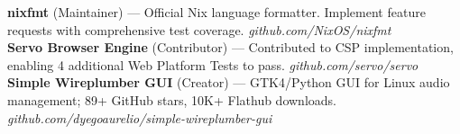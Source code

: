 
\vspace{2pt}
\noindent\textbf{nixfmt} (Maintainer) --- Official Nix language formatter. Implement feature requests with comprehensive test coverage. \textit{github.com/NixOS/nixfmt}\\[3pt]
\noindent\textbf{Servo Browser Engine} (Contributor) --- Contributed to CSP implementation, enabling 4 additional Web Platform Tests to pass. \textit{github.com/servo/servo}\\[3pt]
\noindent\textbf{Simple Wireplumber GUI} (Creator) --- GTK4/Python GUI for Linux audio management; 89+ GitHub stars, 10K+ Flathub downloads. \textit{github.com/dyegoaurelio/simple-wireplumber-gui}
